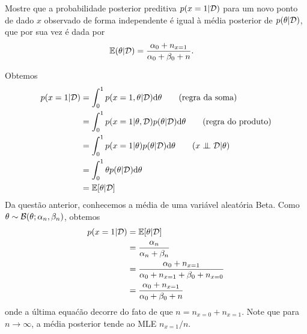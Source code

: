 \begin{exenumerate}
    \item  \label{q:bernoulli-posterior-predictive-alt} Mostre que a probabilidade posterior preditiva $p( x=1 | \mathcal{D} )$ para um
    novo ponto de dado $x$ observado de forma independente \'e igual \`a m\'edia posterior
    de $p(\theta | \mathcal{D})$, que por sua vez \'e dada por
    \begin{align}
        \mathbb{E}( \theta | \mathcal{D}) & = \frac{\alpha_0 + n_{x=1}}{\alpha_0+\beta_0+n}.
        \label{eq:bernoulli-posterior-mean-alt}
    \end{align}
    \begin{solution}
        Obtemos
        \begin{align}
            p(x=1 | \mathcal{D}) & = \int_0^1 p(x=1, \theta | \mathcal{D}) \mathrm{d} \theta \quad \quad \text{(regra da soma)}\\
            & = \int_0^1 p(x=1 | \theta, \mathcal{D}) p(\theta | \mathcal{D}) \mathrm{d} \theta \quad \quad \text{(regra do produto)} \\
            & = \int_0^1 p(x=1 | \theta) p(\theta | \mathcal{D}) \mathrm{d} \theta \quad \quad (x \mathrel{\perp\mspace{-10mu}\perp} \mathcal{D} | \theta) \\
            & = \int_0^1 \theta p(\theta | \mathcal{D}) \mathrm{d} \theta\\
            & = \mathbb{E}[ \theta | \mathcal{D}]
        \end{align}
        Da quest\~ao anterior, conhecemos a m\'edia de uma vari\'avel aleat\'oria Beta. Como $\theta \sim \mathcal{B}(\theta ; \alpha_n, \beta_n)$, obtemos
        \begin{align}
            p(x=1 | \mathcal{D}) & =  \mathbb{E}[ \theta | \mathcal{D}]\\
            & = \frac{\alpha_n}{\alpha_n+\beta_n}\\
            & = \frac{\alpha_0 +  n_{x=1}} {\alpha_0+ n_{x=1} + \beta_0 +  n_{x=0}}\\
            & = \frac{\alpha_0 +  n_{x=1}}{\alpha_0+ \beta_0 + n}
        \end{align}
        onde a \'ultima equa\'c\~ao decorre do fato de que $n = n_{x=0}+n_{x=1}$. Note que para $n \to \infty$, a m\'edia posterior tende ao MLE
        $n_{x=1}/n$.
        
    \end{solution}
    
    
\end{exenumerate}


\label{ex:Bayesian-Inference-DGM-alt}

